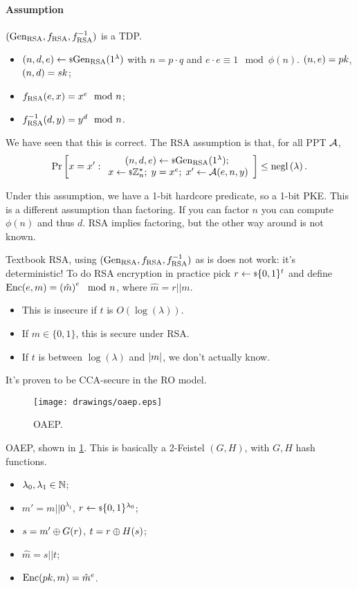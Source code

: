 \paragraph{Assumption} $(\mathrm{Gen}_{\mathrm{RSA}}, f_{\mathrm{RSA}}, f_{\mathrm{RSA}}^{-1})$ is a \ac{TDP}.
\begin{itemize}
	\item $(n,d,e) \leftarrow {\scriptstyle \$} {\mathrm{Gen}_{\mathrm{RSA}}(1^{\lambda})}$ with $n = p \cdot q$ and $e \cdot e \equiv 1 \mod \phi(n)$.
		$(n,e) = pk$, $(n,d) = sk$;
	\item $f_{\mathrm{RSA}}(e,x) = x^e \mod n$;
	\item $f_{\mathrm{RSA}}^{-1}(d,y) = y^d \mod n$.
\end{itemize}
We have seen that this is correct.
The \ac{RSA} assumption is that, for all \ac{PPT} $\mathcal{A}$,
\begin{equation*}
	\mathop{\mathrm{Pr}}\limits_{} \left[ {
		x = x' :
		\begin{array}{c}
		(n,d,e) \leftarrow {\scriptstyle \$} {\mathrm{Gen}_{\mathrm{RSA}}(1^{\lambda})}; \;
		\\
		x \leftarrow {\scriptstyle \$} {\mathbb{Z}_n^{\star}}; \;
		y = x^e; \;
		x' \leftarrow \mathcal{A}(e, n, y)
		\end{array}
	} \right]
	\le \mathrm{negl}\left({\lambda}\right).
\end{equation*}

Under this assumption, we have a 1-bit hardcore predicate, so a 1-bit \ac{PKE}.
This is a different assumption than factoring.
If you can factor $n$ you can compute $\phi(n)$ and thus $d$.
\ac{RSA} implies factoring, but the other way around is not known.

Textbook \ac{RSA}, \ie using $(\mathrm{Gen}_{\mathrm{RSA}}, f_{\mathrm{RSA}}, f_{\mathrm{RSA}}^{-1})$ as is does not work: it's deterministic!
To do \ac{RSA} encryption in practice pick $r \leftarrow {\scriptstyle \$} {\{0,1\}^{t}}$ and define $\mathrm{Enc}(e,m) = \left(\hat{m}\right)^{e} \mod n$, where $\hat{m} = r || m$.
\begin{itemize}
	\item This is insecure if $t$ is $O(\log(\lambda))$.
	\item If $m \in \{0,1\}$, this is secure under \ac{RSA}.
	\item If $t$ is between $\log(\lambda)$ and $\left|{m}\right|$, we don't actually know.
\end{itemize}
It's proven to be \ac{CCA}-secure in the \ac{RO} model. 

\begin{construction} \label{cons:oaep}
	\begin{figure}
		\centering
		\texttt{[image: drawings/oaep.eps]}
		\caption{\acl{OAEP}.}
		\label{fig:oaep}
	\end{figure}
	\ac{OAEP}, shown in \cref{fig:oaep}.
	This is basically a 2-Feistel $(G,H)$, with $G,H$ hash functions.
	\begin{itemize}
		\item $\lambda_0, \lambda_1 \in \mathbb{N}$;
		\item $m' = m || 0^{\lambda_1}$, $r \leftarrow {\scriptstyle \$} {\{0,1\}^{\lambda_0}}$;
		\item $s = m' \oplus G(r)$, $t = r \oplus H(s)$;
		\item $\hat{m} = s || t$;
		\item $\mathrm{Enc}(pk, m) = \hat{m}^{e}$. \qedhere
	\end{itemize}
\end{construction}


